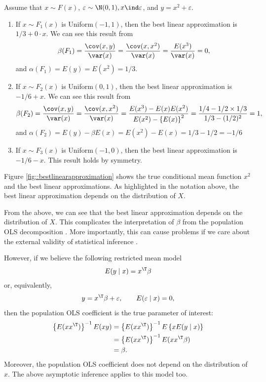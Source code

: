 \begin{example}\label{eg::bestlinearapproximations}
Assume that $x\sim F(x)$, $\varepsilon\sim\N(0,1),x\ind\varepsilon$,
and $y=x^{2}+\varepsilon$.
\begin{enumerate}
\item
If $x\sim F_{1}(x)$ is Uniform$(-1,1)$, then the best linear
approximation is $1/3+0\cdot x$. We can see this result from
$$
\beta(F_{1})=\frac{\text{\cov}(x,y)}{\var(x)}=\frac{\cov(x,x^{2})}{\var(x)}=\frac{E(x^{3})}{\var(x)}=0,
$$
and $\alpha(F_{1})=E(y)=E(x^{2}) =1/3$. 

\item
If $x\sim F_{2}(x)$ is Uniform$(0,1)$, then the best linear approximation is $-1/6+x$. We can see this result from 
$$
\beta(F_{2})=\frac{\cov(x,y)}{\var(x)}=\frac{\cov(x,x^{2})}{\var(x)}=\frac{E(x^{3})-E(x)E(x^{2})}{E(x^{2})-\left\{ E(x)\right\} ^{2}}=\frac{1/4-1/2\times1/3}{1/3-(1/2)^{2}}=1,
$$
and $\alpha(F_{2})=E(y)-\beta E(x)=E(x^{2})-E(x)=1/3-1/2=-1/6$

\item 
If $x\sim F_{3}(x)$ is Uniform$(-1,0)$, then the best linear approximation is $-1/6-x.$ This result holds by symmetry. 
\end{enumerate}
Figure \ref{fig::bestlinearapproximation} shows the true conditional mean function $x^2$ and the best linear approximations. As highlighted in the notation above, the best linear approximation
depends on the distribution of $X$.
\end{example}

 


 

From the above, we can see that the best linear approximation
depends on the distribution of $X$. This complicates the interpretation of $\beta$ from the population OLS decomposition \citep{buja2019models}. More importantly, this can cause problems if we care about the external validity of statistical inference \citep[][page 66]{sims2010but}. 

However, if we believe the following restricted mean model
\begin{eqnarray}
E(y\mid x)=x^{\T}\beta
\label{eq::restricted-mean-model}
\end{eqnarray}
or, equivalently, 
\[
y=x^{\T}\beta+\varepsilon,\qquad E(\varepsilon\mid x)=0,
\]
then the population OLS coefficient is the true parameter of interest:
\begin{align*}
\left\{ E(xx^{\T})\right\} ^{-1}E(xy) & =\left\{ E(xx^{\T})\right\} ^{-1}E\left\{ xE(y\mid x)\right\} \\
 & =\left\{ E(xx^{\T})\right\} ^{-1}E(xx^{\T}\beta)\\
 & =\beta.
\end{align*}
Moreover, the population OLS coefficient does not depend on the distribution
of $x$. The above asymptotic inference applies to this model too. 


